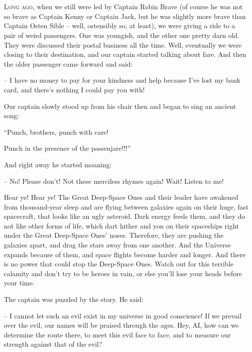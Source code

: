 \documentclass[ebook,twoside,final,openright]{memoir}
\begin{document}
\chapter{}
\par
\lettrine{L}{ong ago,} when we still were led by Captain Robin Brave (of course he was not so brave as Captain Kenny or Captain Jack, but he was slightly more brave than Captain Osten Sible – well, ostensibly so, at least), we were giving a ride to a pair of weird passengers. One was youngish, and the other one pretty darn old. They were discussed their postal business all the time. Well, eventually we were closing to their destination, and our captain started talking about fare. And then the older passenger came forward and said: \par
\par
– I have no money to pay for your kindness and help because I’ve lost my bank card, and there’s nothing I could pay you with!\par
Our captain slowly stood up from his chair then and began to sing an ancient song: \par
“Punch, brothers, punch with care! \par
 Punch in the presence of the passenjare!!!” \par
And right away he started moaning: \par
 – No! Please don’t! Not these merciless rhymes again! Wait! Listen to me!\par
\par
Hear ye! Hear ye! The Great Deep-Space Ones and their leader have awakened from thousand-year sleep and are flying between galaxies again on their huge, fast spacecraft, that looks like an ugly asteroid. Dark energy feeds them, and they do not like other forms of life, which dart hither and yon on their spaceships right under the Great Deep-Space Ones’ noses. Therefore, they are pushing the galaxies apart, and drag the stars away from one another. And the Universe expands because of them, and space flights become harder and longer. And there is no power that could stop the Deep-Space Ones. Watch out for this terrible calamity and don’t try to be heroes in vain, or else you’ll lose your heads before your time.\par
\par
The captain was puzzled by the story. He said:\par
– I cannot let such an evil exist in my universe in good conscience! If we prevail over the evil, our names will be praised through the ages. Hey, AI, how can we determine the route there, to meet this evil face to face, and to measure our strength against that of the evil?\par
\end{document}
